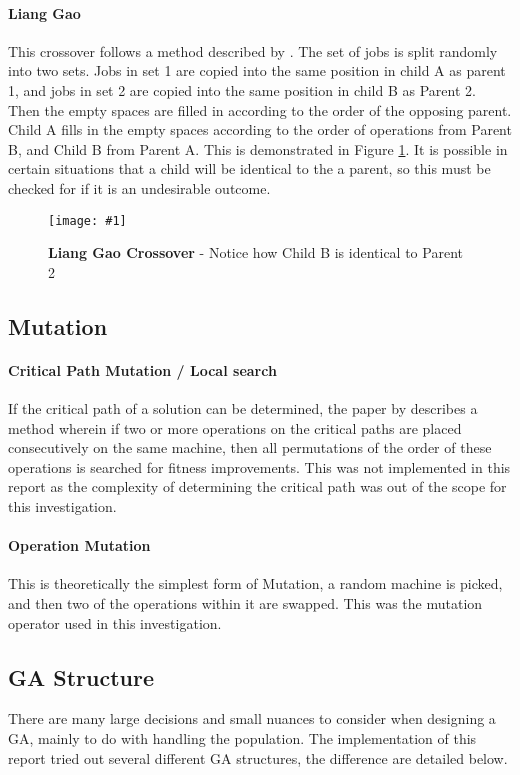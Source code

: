 \documentclass[14pt]{acmsiggraph}
\newcommand{\figuremacroW}[4]{
	\begin{figure}[h] %
		\centering
		\texttt{[image: \#1]}
		\caption[#2]{\textbf{#2} - #3}
		\label{fig:#1}
	\end{figure}
}
\begin{document}
\paragraph{Liang Gao}
This crossover follows a method described by \cite{gao2011efficient}. The set of jobs is split randomly into two sets. Jobs in set 1 are copied into the same position in child A as parent 1, and jobs in set 2 are copied into the same position in child B as Parent 2. Then the empty spaces are filled in according to the order of the opposing parent. Child A fills in the empty spaces according to the order of operations from Parent B, and Child B from Parent A. This is demonstrated in Figure \ref{fig:cx}. It is possible in certain situations that a child will be identical to the a parent, so this must be checked for if it is an undesirable outcome.

\figuremacroW
{cx}
{Liang Gao Crossover}
{Notice how Child B is identical to Parent 2}
{1.0}

\subsection{Mutation}
\paragraph {Critical Path Mutation / Local search}
If the critical path of a solution can be determined, the paper by \cite{gao2011efficient} describes a method wherein if two or more operations on the critical paths are placed consecutively on the same machine, then all permutations of the order of these operations is searched for fitness improvements. This was not implemented in this report as the complexity of determining the critical path was out of the scope for this investigation.

\paragraph{Operation Mutation}
This is theoretically the simplest form of Mutation, a random machine is picked, and then two of the operations within it are swapped. This was the mutation operator used in this investigation.

\subsection{GA Structure}
There are many large decisions and small nuances to consider when designing a GA, mainly to do with handling the population. The implementation of this report tried out several different GA structures, the difference are detailed below. 
\end{document}
